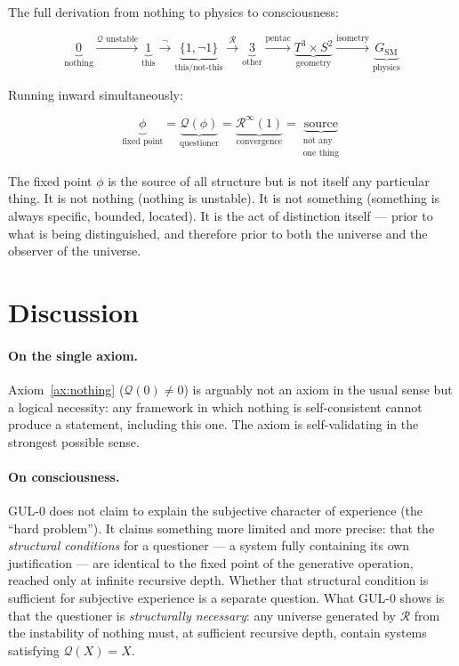 \documentclass[11pt]{article}
\begin{document}
The full derivation from nothing to physics to consciousness:

\begin{equation}
  \underbrace{0}_{\text{nothing}}
  \xrightarrow{\mathcal{Q}\text{ unstable}}
  \underbrace{1}_{\text{this}}
  \xrightarrow{\neg}
  \underbrace{\{1,\neg 1\}}_{\text{this/not-this}}
  \xrightarrow{\mathcal{R}}
  \underbrace{3}_{\text{other}}
  \xrightarrow{\text{pentac}}
  \underbrace{T^3\times S^2}_{\text{geometry}}
  \xrightarrow{\text{isometry}}
  \underbrace{G_{\mathrm{SM}}}_{\text{physics}}
\end{equation}

Running inward simultaneously:

\begin{equation}
  \underbrace{\phi}_{\text{fixed point}}
  =
  \underbrace{\mathcal{Q}(\phi)}_{\text{questioner}}
  =
  \underbrace{\mathcal{R}^\infty(1)}_{\text{convergence}}
  =
  \underbrace{\text{source}}_{\substack{\text{not any}\\\text{one thing}}}
\end{equation}

The fixed point $\phi$ is the source of all structure but is not
itself any particular thing. It is not nothing (nothing is unstable).
It is not something (something is always specific, bounded, located).
It is the act of distinction itself --- prior to what is being
distinguished, and therefore prior to both the universe and the
observer of the universe.

\section{Discussion}
\label{sec:discussion}

\paragraph{On the single axiom.}
Axiom~\ref{ax:nothing} ($\mathcal{Q}(0)\neq 0$) is arguably
not an axiom in the usual sense but a logical necessity: any
framework in which nothing is self-consistent cannot produce
a statement, including this one. The axiom is self-validating
in the strongest possible sense.

\paragraph{On consciousness.}
GUL-0 does not claim to explain the subjective character of
experience (the ``hard problem''). It claims something more
limited and more precise: that the \emph{structural conditions}
for a questioner --- a system fully containing its own
justification --- are identical to the fixed point of the
generative operation, reached only at infinite recursive depth.
Whether that structural condition is sufficient for subjective
experience is a separate question. What GUL-0 shows is that
the questioner is \emph{structurally necessary}: any universe
generated by $\mathcal{R}$ from the instability of nothing
must, at sufficient recursive depth, contain systems satisfying
$\mathcal{Q}(X)=X$.
\end{document}
